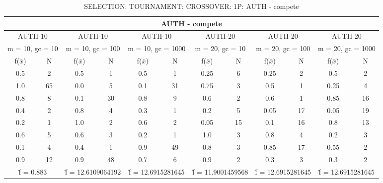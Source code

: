 \begin{table}[H]
	\centering
	\caption{SELECTION: TOURNAMENT; CROSSOVER: 1P: AUTH - compete}
	\begin{adjustbox}{width=1\textwidth}
		\begin{tabular}{ |c|c||c|c||c|c||c|c||c|c||c|c| }
			\hline
			\multicolumn{12}{|c|}{AUTH - compete} \\
			\hline
			\multicolumn{2}{|c||}{AUTH-10} & \multicolumn{2}{c||}{AUTH-10} & \multicolumn{2}{c||}{AUTH-10} & \multicolumn{2}{c||}{AUTH-20} & \multicolumn{2}{c||}{AUTH-20} & \multicolumn{2}{c|}{AUTH-20}\\
			\hline
			\multicolumn{2}{|c||}{m = 10, gc = 10} & \multicolumn{2}{c||}{m = 10, gc = 100} & \multicolumn{2}{c||}{m = 10, gc = 1000} & \multicolumn{2}{c||}{m = 20, gc = 10} & \multicolumn{2}{c||}{m = 20, gc = 100} & \multicolumn{2}{c|}{m = 20, gc = 1000}\\
			\hline
			f($\bar{x}$) & N & f($\bar{x}$) & N & f($\bar{x}$) & N & f($\bar{x}$) & N & f($\bar{x}$) & N & f($\bar{x}$) & N\\
			\hline
			\hline
			0.5 & 2 & 0.5 & 1 & 0.5 & 1 & 0.25 & 6 & 0.25 & 2 & 0.5 & 2\\
			1.0 & 65 & 0.0 & 5 & 0.1 & 31 & 0.75 & 3 & 0.5 & 1 & 0.25 & 4\\
			0.8 & 8 & 0.1 & 30 & 0.8 & 9 & 0.6 & 2 & 0.6 & 1 & 0.85 & 16\\
			0.4 & 2 & 0.8 & 4 & 0.3 & 1 & 0.2 & 5 & 0.05 & 17 & 0.05 & 19\\
			0.2 & 1 & 1.0 & 2 & 0.6 & 2 & 0.05 & 15 & 0.1 & 16 & 0.8 & 13\\
			0.6 & 5 & 0.6 & 3 & 0.2 & 1 & 1.0 & 3 & 0.8 & 4 & 0.2 & 3\\
			0.1 & 4 & 0.4 & 1 & 0.9 & 49 & 0.8 & 3 & 0.85 & 17 & 0.55 & 2\\
			0.9 & 12 & 0.9 & 48 & 0.7 & 6 & 0.9 & 2 & 0.3 & 3 & 0.3 & 2\\
			\hline
			\multicolumn{2}{|c||}{\^{f} = 0.883} & \multicolumn{2}{c||}{\^{f} = 12.6109064192} & \multicolumn{2}{c||}{\^{f} = 12.6915281645} & \multicolumn{2}{c||}{\^{f} = 11.9001459568} & \multicolumn{2}{c||}{\^{f} = 12.6915281645} & \multicolumn{2}{c|}{\^{f} = 12.6915281645}\\
			\hline
		\end{tabular}
	\end{adjustbox}
\end{table}
